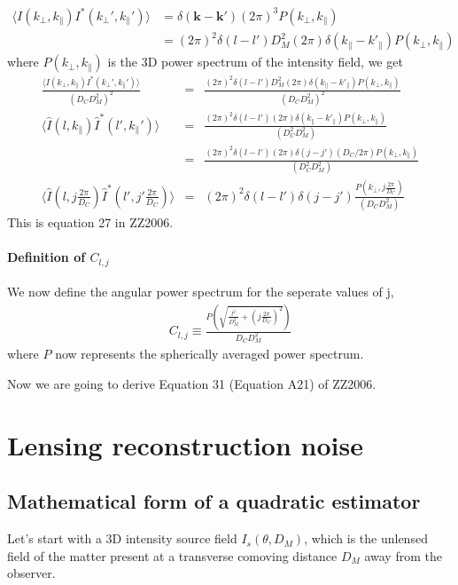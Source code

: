\documentclass[12pt]{article}
\newcommand{\beq}{\begin{equation}}
\newcommand{\eeq}{\end{equation}}
\newcommand{\beqa}{\begin{eqnarray}}
\newcommand{\eeqa}{\end{eqnarray}}
\newcommand{\beqal}{\begin{aligned}}
\newcommand{\eeqal}{\end{aligned}}
\numberwithin{equation}{section}
\begin{document}
\beq
\beqal
\langle I(k_\perp, k_\parallel) I^*(k_\perp', k_\parallel')   \rangle &= \delta(\textbf{k} - \textbf{k}') (2\pi)^3 P(k_\perp, k_\parallel)
\\
&= (2\pi)^2 \delta(l - l') D_M^2 (2\pi) \delta(k_\parallel - k'_\parallel) P(k_\perp, k_\parallel) \label{eq:3dcorr}
\eeqal
\eeq
where  $ P(k_\perp, k_\parallel) $ is the 3D power spectrum of the intensity field, we get
\beqa
\frac{\langle I(k_\perp, k_\parallel) I^*(k_\perp', k_\parallel')   \rangle}{(D_C D_M^2)^2} &=& \frac{(2\pi)^2 \delta(l - l') D_M^2 (2\pi) \delta(k_\parallel - k'_\parallel) P(k_\perp, k_\parallel) }{(D_C D_M^2)^2}
\\
\langle \hat{I}(l, k_\parallel) \hat{I}^*(l', k_\parallel')   \rangle &=& \frac{(2\pi)^2 \delta(l - l')  (2\pi) \delta(k_\parallel - k'_\parallel) P(k_\perp, k_\parallel) }{(D_C^2 D_M^2)}
\\
&=& \frac{(2\pi)^2 \delta(l - l')  (2\pi) \delta(j - j') (D_C/2\pi) P(k_\perp, k_\parallel) }{(D_C^2 D_M^2)}
\\
\langle \hat{I}(l, j \frac{2\pi}{D_C}) \hat{I}^*(l', j'\frac{2\pi}{D_C})   \rangle  &=& (2\pi)^2 \delta(l - l') \delta(j - j')  \frac{P(k_\perp, j\frac{2\pi}{D_C}) }{(D_C D_M^2)}
\eeqa
This is equation 27 in ZZ2006.

\paragraph{Definition of $ C_{l,j} $}
We now define the angular power spectrum for the seperate values of j, 
\beqa
C_{l,j} \equiv \frac{P \left( \sqrt{\frac{l^2}{D_M^2} + (j\frac{2\pi}{D_C})^2} \right)}{D_C D_M^2}
\eeqa
where $ P $ now represents the spherically averaged power spectrum.


Now we are going to derive Equation 31 (Equation A21) of ZZ2006.

\section{Lensing reconstruction noise}
\subsection{Mathematical form of a quadratic estimator}
Let's start with a 3D intensity source field $I_s(\theta, D_M)$, which is the unlensed field of the matter present at a transverse comoving distance $D_M$ away from the observer. 
\end{document}
